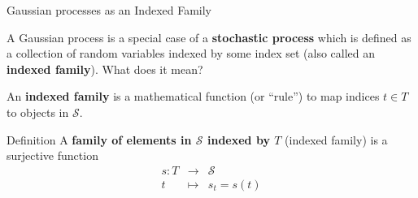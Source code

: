 \documentclass[11pt,compress,t,notes=noshow, xcolor=table]{beamer}
\begin{document}
\begin{vbframe}{Gaussian processes as an Indexed Family}



A Gaussian process is a special case of a \textbf{stochastic process} which is defined as a collection of random variables indexed by some index set (also called an \textbf{indexed family}). What does it mean? 

\lz 

An \textbf{indexed family} is a mathematical function (or \enquote{rule}) to map indices $t \in T$ to objects in $\mathcal{S}$. 

\begin{block}{Definition}
A \textbf{family of elements in $\mathcal{S}$ indexed by $T$} (indexed family) is a surjective function 
\vspace*{-0.3cm}
\begin{eqnarray*}
s: T &\to& \mathcal{S} \\
   t &\mapsto& s_t = s(t) 
\end{eqnarray*}
\end{block}

\end{vbframe}
\end{document}
